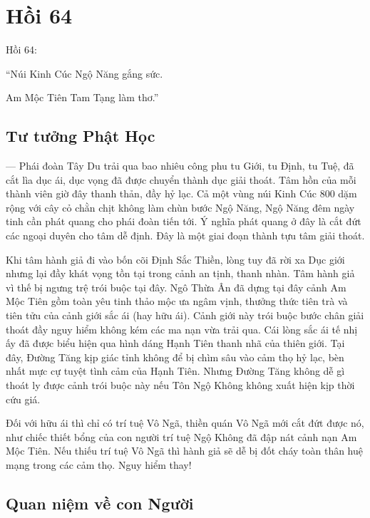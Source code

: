 \chapter{Hồi 64} %
\label{cha:hoi_64}

Hồi 64:

\begin{itshape}
``Núi Kinh Cúc Ngộ Năng gắng sức.

Am Mộc Tiên Tam Tạng làm thơ.''
\end{itshape}

\section{Tư tưởng Phật Học} %
\label{sec:64_phat_hoc}

--- Phái đoàn Tây Du trải qua bao nhiêu công phu tu Giới, tu Định, tu Tuệ, đã cắt lìa dục ái, dục vọng đã được chuyển thành dục giải thoát. Tâm hồn của mỗi thành viên giờ đây thanh thản, đầy hỷ lạc. Cả một vùng núi Kinh Cúc 800 dặm rộng với cây cỏ chằn chịt không làm chùn bước Ngộ Năng, Ngộ Năng đêm ngày tinh cần phát quang cho phái đoàn tiến tới. Ý nghĩa phát quang ở đây là cắt đứt các ngoại duyên cho tâm dễ định. Đây là một giai đoạn thành tựu tâm giải thoát.

Khi tâm hành giả đi vào bốn cõi Định Sắc Thiền, lòng tuy đã rời xa Dục giới nhưng lại đầy khát vọng tồn tại trong cảnh an tịnh, thanh nhàn. Tâm hành giả vì thế bị ngưng trệ trói buộc tại đây. Ngô Thừa Ân đã dựng tại đây cảnh Am Mộc Tiên gồm toàn yêu tinh thảo mộc ưa ngâm vịnh, thưởng thức tiên trà và tiên tửu của cảnh giới sắc ái (hay hữu ái). Cảnh giới này trói buộc bước chân giải thoát đầy nguy hiểm không kém các ma nạn vừa trải qua. Cái lòng sắc ái tế nhị ấy đã được biểu hiện qua hình dáng Hạnh Tiên thanh nhã của thiên giới. Tại đây, Đường Tăng kịp giác tỉnh không để bị chìm sâu vào cảm thọ hỷ lạc, bèn nhất mực cự tuyệt tình cảm của Hạnh Tiên. Nhưng Đường Tăng không dễ gì thoát ly được cảnh trói buộc này nếu Tôn Ngộ Không không xuất hiện kịp thời cứu giá.

Đối với hữu ái thì chỉ có trí tuệ Vô Ngã, thiền quán Vô Ngã mới cắt đứt được nó, như chiếc thiết bổng của con người trí tuệ Ngộ Không đã đập nát cảnh nạn Am Mộc Tiên. Nếu thiếu trí tuệ Vô Ngã thì hành giả sẽ dễ bị đốt cháy toàn thân huệ mạng trong các cảm thọ. Nguy hiểm thay!

\section{Quan niệm về con Người} %
\label{sec:64_con_nguoi}

